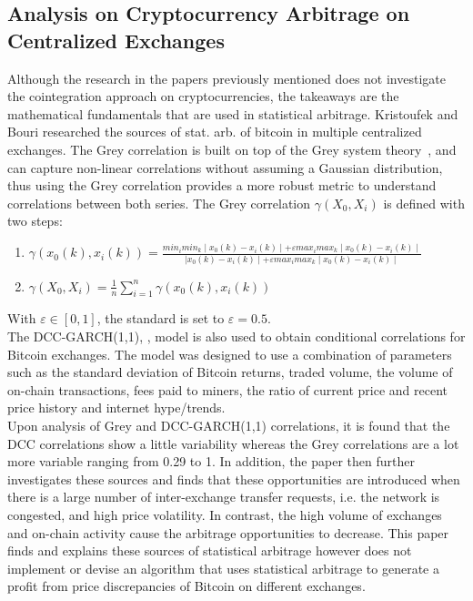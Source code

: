 \subsection{Analysis on Cryptocurrency Arbitrage on Centralized Exchanges}
Although the research in the papers previously mentioned does not investigate the cointegration approach on cryptocurrencies, the takeaways are the mathematical fundamentals that are used in statistical arbitrage. Kristoufek and Bouri researched the sources of stat. arb. of bitcoin in multiple centralized exchanges. The Grey correlation is built on top of the Grey system theory~\cite{JULONG1982288}, and can capture non-linear correlations without assuming a Gaussian distribution, thus using the Grey correlation provides a more robust metric to understand correlations between both series. The Grey correlation $\gamma(X_0, X_i)$ is defined with two steps:
\begin{enumerate}
    \item $\gamma(x_0(k), x_i(k)) = \frac{min_i min_k \mid x_0(k) - x_i(k) \mid + \varepsilon max_i max_k \mid x_0(k) - x_i(k) \mid}{\mid x_0(k) - x_i(k) \mid + \varepsilon max_i max_k \mid x_0(k) - x_i(k) \mid}$
    \item $\gamma(X_0, X_i) = \frac{1}{n} \sum_{i=1}^{n} \gamma(x_0(k), x_i(k))$
\end{enumerate}
\noindent With $\varepsilon \in [0,1]$, the standard is set to $\varepsilon = 0.5$.
\\[5mm]
The DCC-GARCH(1,1), \cite{engle2002dynamic}, model is also used to obtain conditional correlations for Bitcoin exchanges. The model was designed to use a combination of parameters such as the standard deviation of Bitcoin returns, traded volume, the volume of on-chain transactions, fees paid to miners, the ratio of current price and recent price history and internet hype/trends.
\\[5mm]
Upon analysis of Grey and DCC-GARCH(1,1) correlations, it is found that the DCC correlations show a little variability whereas the Grey correlations are a lot more variable ranging from 0.29 to 1. In addition, the paper then further investigates these sources and finds that these opportunities are introduced when there is a large number of inter-exchange transfer requests, i.e. the network is congested, and high price volatility. In contrast, the high volume of exchanges and on-chain activity cause the arbitrage opportunities to decrease. This paper finds and explains these sources of statistical arbitrage however does not implement or devise an algorithm that uses statistical arbitrage to generate a profit from price discrepancies of Bitcoin on different exchanges.
